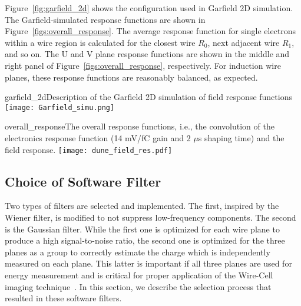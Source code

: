     
    Figure~\ref{fig:garfield_2d} shows the configuration used in Garfield 2D simulation.
The Garfield-simulated response functions are shown in Figure~\ref{figs:overall_response}.
 The average response function for single electrons within a wire region 
is calculated for the closest wire $R_0$, next adjacent wire $R_1$, and so on. The U and 
V plane response functions are shown in the middle and right panel of 
Figure~\ref{figs:overall_response}, respectively.  For induction wire planes, these response 
functions are reasonably balanced, as expected.


\begin{cdrfigure}{garfield_2d}{Description of the Garfield 2D simulation of field response functions}
  \texttt{[image: Garfield\_simu.png]}
\end{cdrfigure}


\begin{cdrfigure}{overall_response}{The overall response functions, i.e., %
the convolution of the
electronics response function (14 mV/fC gain and 2 $\mu$s shaping time) 
and the field response.}
\texttt{[image: dune\_field\_res.pdf]}
\end{cdrfigure}

\subsection{Choice of Software Filter}

Two types of filters are selected and implemented.  The first, inspired by the Wiener filter,  
 is modified to not suppress low-frequency components.  The second is the 
Gaussian filter. While the first one is optimized  for each wire plane to produce a 
high signal-to-noise ratio, the second one is optimized for the three planes as a group %
to correctly estimate the charge which is independently measured on each  plane. %
This latter is important if all three planes are used for energy measurement 
and is critical for proper application of the Wire-Cell imaging technique~\cite{wire-cell}.  
In this section, we describe the selection process that resulted in %
these software filters.

